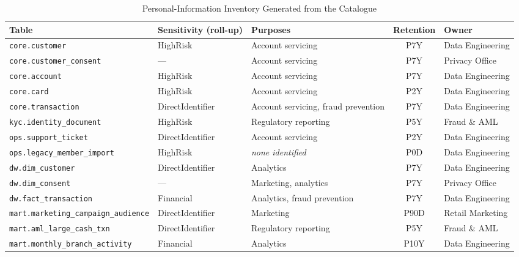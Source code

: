 \documentclass[journal,onecolumn,11pt]{IEEEtran}
\begin{document}
\begin{table}[!t]
\caption{Personal-Information Inventory Generated from the Catalogue}
\label{tab:inventory}
\centering\footnotesize
\begin{tabularx}{\linewidth}{L{6.1cm} L{2.3cm} Y c L{2.2cm}}
\toprule
\textbf{Table} & \textbf{Sensitivity (roll-up)} & \textbf{Purposes} & \textbf{Retention} & \textbf{Owner} \\
\midrule
\texttt{core.customer} & HighRisk & Account servicing & P7Y & Data Engineering \\
\texttt{core.customer\_consent} & --- & Account servicing & P7Y & Privacy Office \\
\texttt{core.account} & HighRisk & Account servicing & P7Y & Data Engineering \\
\texttt{core.card} & HighRisk & Account servicing & P2Y & Data Engineering \\
\texttt{core.transaction} & DirectIdentifier & Account servicing, fraud prevention & P7Y & Data Engineering \\
\texttt{kyc.identity\_document} & HighRisk & Regulatory reporting & P5Y & Fraud \& AML \\
\texttt{ops.support\_ticket} & DirectIdentifier & Account servicing & P2Y & Data Engineering \\
\texttt{ops.legacy\_member\_import} & HighRisk & \emph{none identified} & P0D & Data Engineering \\
\texttt{dw.dim\_customer} & DirectIdentifier & Analytics & P7Y & Data Engineering \\
\texttt{dw.dim\_consent} & --- & Marketing, analytics & P7Y & Privacy Office \\
\texttt{dw.fact\_transaction} & Financial & Analytics, fraud prevention & P7Y & Data Engineering \\
\texttt{mart.marketing\_campaign\_audience} & DirectIdentifier & Marketing & P90D & Retail Marketing \\
\texttt{mart.aml\_large\_cash\_txn} & DirectIdentifier & Regulatory reporting & P5Y & Fraud \& AML \\
\texttt{mart.monthly\_branch\_activity} & Financial & Analytics & P10Y & Data Engineering \\
\bottomrule
\end{tabularx}
\end{table}
\end{document}
